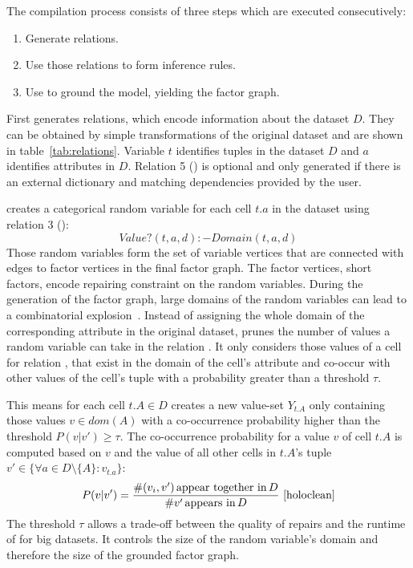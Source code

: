   The compilation process consists of three steps which are executed consecutively:
  \begin{enumerate}
    \item Generate \ddlog{} relations.
    \item Use those relations to form inference rules.
    \item Use \deepdive{} to ground the model, yielding the factor graph.
  \end{enumerate}

  First \holoclean{} generates \ddlog{} relations, which encode information about the dataset $D$.
  They can be obtained by simple transformations of the original dataset and are shown in table~\ref{tab:relations}.
  Variable $t$ identifies tuples in the dataset $D$ and $a$ identifies attributes in $D$.
  Relation 5 () is optional and only generated if there is an external dictionary and matching dependencies provided by the user.

  \holoclean{} creates a categorical random variable for each cell $t.a$ in the dataset using relation 3 ():
  \begin{equation}
    Value?(t,a,d):-Domain(t,a,d)\label{equ:cells}
  \end{equation}
  Those random variables form the set of variable vertices that are connected with edges to factor vertices in the final factor graph.
  The factor vertices, short factors, encode repairing constraint on the random variables.
  During the generation of the factor graph, large domains of the random variables can lead to a combinatorial explosion~\cite{pgm}.
  Instead of assigning the whole domain of the corresponding attribute in the original dataset, \holoclean{} prunes the number of values a random variable can take in the relation .
  It only considers those values of a cell for relation , that exist in the domain of the cell's attribute and co-occur with other values of the cell's tuple with a probability greater than a threshold $\tau$.

  This means for each cell $t.A \in D$ \holoclean{} creates a new value-set $Y_{t.A}$ only containing those values $v \in dom(A)$ with a co-occurrence probability higher than the threshold $P(v|v') \geq \tau$.
  The co-occurrence probability for a value $v$ of cell $t.A$ is computed based on $v$ and the value of all other cells in $t.A$'s tuple $v' \in \{\forall a \in D\setminus\{A\}: v_{t.a}\}$:
  \begin{equation}
    P(v|v') = \frac{\#(v_i,v')\,\text{appear together in}\, D}{\#v'\,\text{appears in}\, D}~\cite{holoclean}
  \end{equation}
  The threshold $\tau$ allows a trade-off between the quality of repairs and the runtime of \holoclean{} for big datasets.
  It controls the size of the random variable's domain and therefore the size of the grounded factor graph.

